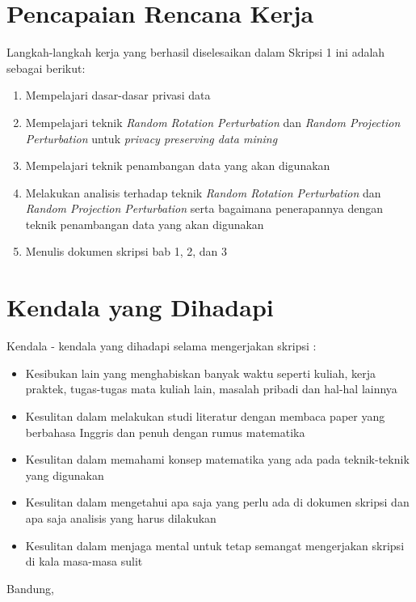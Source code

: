 \documentclass[a4paper,twoside]{article}
\begin{document}
\section{Pencapaian Rencana Kerja}
Langkah-langkah kerja yang berhasil diselesaikan dalam Skripsi 1 ini adalah sebagai berikut:
\begin{enumerate}
	\item Mempelajari dasar-dasar privasi data
	\item Mempelajari teknik \textit{Random Rotation Perturbation} dan \textit{Random Projection Perturbation} untuk \textit{privacy preserving data mining}
	\item Mempelajari teknik penambangan data yang akan digunakan
	\item Melakukan analisis terhadap teknik \textit{Random Rotation Perturbation} dan \textit{Random Projection Perturbation} serta bagaimana penerapannya dengan teknik penambangan data yang akan digunakan
	\item Menulis dokumen skripsi bab 1, 2, dan 3
\end{enumerate}



\section{Kendala yang Dihadapi}
Kendala - kendala yang dihadapi selama mengerjakan skripsi :
\begin{itemize}
	\item Kesibukan lain yang menghabiskan banyak waktu seperti kuliah, kerja praktek, tugas-tugas mata kuliah lain, masalah pribadi dan hal-hal lainnya
	\item Kesulitan dalam melakukan studi literatur dengan membaca paper yang berbahasa Inggris dan penuh dengan rumus matematika
	\item Kesulitan dalam memahami konsep matematika yang ada pada teknik-teknik yang digunakan
	\item Kesulitan dalam mengetahui apa saja yang perlu ada di dokumen skripsi dan apa saja analisis yang harus dilakukan
	\item Kesulitan dalam menjaga mental untuk tetap semangat mengerjakan skripsi di kala masa-masa sulit
\end{itemize}

\vspace{1cm}
\centering Bandung, \tanggal\\
\vspace{2cm} \nama \\ 
\vspace{1cm}
\end{document}
